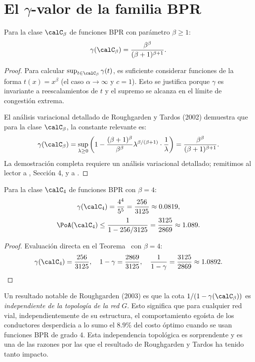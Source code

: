 \section{El $\gamma$-valor de la familia BPR}

\begin{theorem}[Roughgarden, 2003]\label{thm:gamma_bpr}
Para la clase $\calC_\beta$ de funciones BPR con parámetro $\beta \geq 1$:
\[
\gamma(\calC_\beta) = \frac{\beta^\beta}{(\beta+1)^{\beta+1}}.
\]
\end{theorem}

\begin{proof}
Para calcular $\sup_{t \in \calC_\beta} \gamma(t)$, es suficiente considerar funciones de la forma $t(x) = x^\beta$ (el caso $\alpha \to \infty$ y $c = 1$). Esto se justifica porque $\gamma$ es invariante a reescalamientos de $t$ y el supremo se alcanza en el límite de congestión extrema.

El análisis variacional detallado de Roughgarden y Tardos (2002) demuestra que para la clase $\calC_\beta$, la constante relevante es:
\[
\gamma(\calC_\beta) = \sup_{\lambda \geq 0} \left(1 - \frac{(\beta+1)^\beta}{\beta^\beta} \lambda^{\beta/(\beta+1)} \cdot \frac{1}{\lambda}\right) = \frac{\beta^\beta}{(\beta+1)^{\beta+1}}.
\]
La demostración completa requiere un análisis variacional detallado; remitimos al lector a \cite{Roughgarden2002}, Sección 4, y a \cite{Roughgarden2003}.
\end{proof}

\begin{corollary}\label{cor:poa_bpr}
Para la clase $\calC_4$ de funciones BPR con $\beta = 4$:
\[
\gamma(\calC_4) = \frac{4^4}{5^5} = \frac{256}{3125} \approx 0.0819,
\]
\[
\PoA(\calC_4) \leq \frac{1}{1 - 256/3125} = \frac{3125}{2869} \approx 1.089.
\]
\end{corollary}

\begin{proof}
Evaluación directa en el Teorema~ con $\beta = 4$:
\[
\gamma(\calC_4) = \frac{256}{3125}, \quad 1 - \gamma = \frac{2869}{3125}, \quad \frac{1}{1-\gamma} = \frac{3125}{2869} \approx 1.0892. \qedhere
\]
\end{proof}

\begin{remark}
Un resultado notable de Roughgarden (2003) es que la cota $1/(1-\gamma(\calC_\beta))$ es \emph{independiente de la topología de la red} $G$. Esto significa que para cualquier red vial, independientemente de su estructura, el comportamiento egoísta de los conductores desperdicia a lo sumo el $8.9\%$ del costo óptimo cuando se usan funciones BPR de grado 4. Esta independencia topológica es sorprendente y es una de las razones por las que el resultado de Roughgarden y Tardos ha tenido tanto impacto.
\end{remark}

